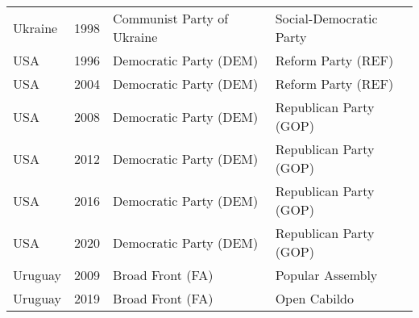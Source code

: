{\begin{longtable}{|l|c|l|l|}
  Ukraine & 1998 &   Communist Party of Ukraine &   Social-Democratic Party \\ 
  USA & 1996 &   Democratic Party (DEM) &   Reform Party (REF) \\ 
    USA& 2004 &   Democratic Party (DEM) &   Reform Party (REF) \\ 
    USA& 2008 &   Democratic Party (DEM) &   Republican Party (GOP) \\ 
    USA & 2012 &   Democratic Party (DEM) &   Republican Party (GOP) \\ 
    USA & 2016 &   Democratic Party (DEM) &   Republican Party (GOP) \\ 
    USA & 2020 &   Democratic Party (DEM) &   Republican Party (GOP) \\ 
   Uruguay & 2009 &   Broad Front (FA) &   Popular Assembly \\ 
   Uruguay & 2019 &   Broad Front (FA) &   Open Cabildo \\ 
  \hline
	\end{longtable} }